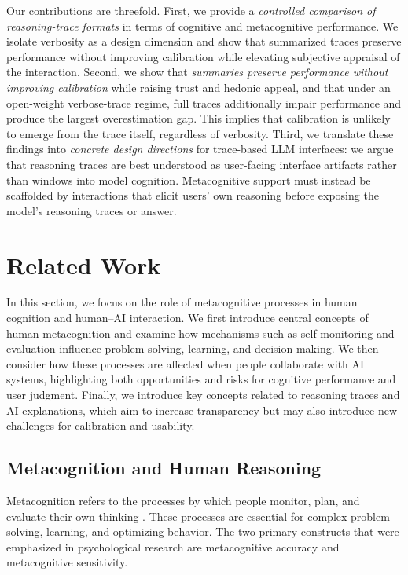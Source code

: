 \documentclass[manuscript, anonymous=false,authorversion,review=false]{acmart}
\begin{document}
Our contributions are threefold. First, we provide a \textit{controlled comparison of reasoning-trace formats} in terms of cognitive and metacognitive performance. We isolate verbosity as a design dimension and show that summarized traces preserve performance without improving calibration while elevating subjective appraisal of the interaction. Second, we show that \textit{summaries preserve performance without improving calibration} while raising trust and hedonic appeal, and that under an open-weight verbose-trace regime, full traces additionally impair performance and produce the largest overestimation gap. This implies that calibration is unlikely to emerge from the trace itself, regardless of verbosity.
Third, we translate these findings into \textit{concrete design directions} for trace-based LLM interfaces: we argue that reasoning traces are best understood as user-facing interface artifacts rather than windows into model cognition. Metacognitive support must instead be scaffolded by interactions that elicit users' own reasoning before exposing the model's reasoning traces or answer.

\section{Related Work}

In this section, we focus on the role of metacognitive processes in human cognition and human–AI interaction. We first introduce central concepts of human metacognition and examine how mechanisms such as self-monitoring and evaluation influence problem-solving, learning, and decision-making. We then consider how these processes are affected when people collaborate with AI systems, highlighting both opportunities and risks for cognitive performance and user judgment. Finally, we introduce key concepts related to reasoning traces and AI explanations, which aim to increase transparency but may also introduce new challenges for calibration and usability.

\subsection{Metacognition and Human Reasoning}\label{sec:human_metacognition}
Metacognition refers to the processes by which people monitor, plan, and evaluate their own thinking \cite{fleming2024metacognition}. These processes are essential for complex problem-solving, learning, and optimizing behavior. The two primary constructs that were emphasized in psychological research are metacognitive accuracy and metacognitive sensitivity.
\end{document}
